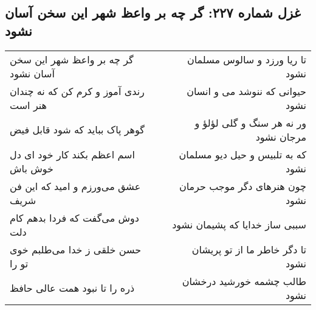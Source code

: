 \begin{center}
\section*{غزل شماره ۲۲۷: گر چه بر واعظ شهر این سخن آسان نشود}
\label{sec:sh227}
\begin{longtable}{l p{0.5cm} r}
گر چه بر واعظ شهر این سخن آسان نشود
&&
تا ریا ورزد و سالوس مسلمان نشود
\\
رندی آموز و کرم کن که نه چندان هنر است
&&
حیوانی که ننوشد می و انسان نشود
\\
گوهر پاک بباید که شود قابل فیض
&&
ور نه هر سنگ و گلی لؤلؤ و مرجان نشود
\\
اسم اعظم بکند کار خود ای دل خوش باش
&&
که به تلبیس و حیل دیو مسلمان نشود
\\
عشق می‌ورزم و امید که این فن شریف
&&
چون هنرهای دگر موجب حرمان نشود
\\
دوش می‌گفت که فردا بدهم کام دلت
&&
سببی ساز خدایا که پشیمان نشود
\\
حسن خلقی ز خدا می‌طلبم خوی تو را
&&
تا دگر خاطر ما از تو پریشان نشود
\\
ذره را تا نبود همت عالی حافظ
&&
طالب چشمه خورشید درخشان نشود
\\
\end{longtable}
\end{center}
